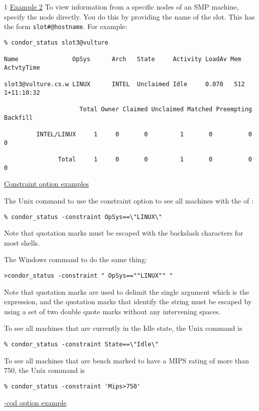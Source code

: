 \begin{ManPage}{\label{man-condor-status}}{1}
\underline{Example 2} To view information from a specific nodes of an
SMP machine, specify the node directly.
You do this by providing the name of the slot.
This has the form \texttt{slot\#@hostname}.
For example:
\footnotesize
\begin{verbatim}
% condor_status slot3@vulture

Name               OpSys      Arch   State     Activity LoadAv Mem   ActvtyTime

slot3@vulture.cs.w LINUX      INTEL  Unclaimed Idle     0.070   512  1+11:10:32

                     Total Owner Claimed Unclaimed Matched Preempting Backfill

         INTEL/LINUX     1     0       0         1       0          0        0

               Total     1     0       0         1       0          0        0
\end{verbatim}
\normalsize

\underline{Constraint option examples}

The Unix command
to use the constraint option to see all machines with the 
of :
\begin{verbatim}
% condor_status -constraint OpSys==\"LINUX\"
\end{verbatim}
Note that quotation marks must be escaped with the backslash characters
for most shells.

The Windows command to do the same thing:
\begin{verbatim}
>condor_status -constraint " OpSys==""LINUX"" "
\end{verbatim}
Note that quotation marks are used to delimit the single argument which
is the expression, and the quotation marks that identify the string
must be escaped by using a set of two double quote marks without
any intervening spaces.

To see all machines that are currently in the Idle state,
the Unix command is
\begin{verbatim}
% condor_status -constraint State==\"Idle\"
\end{verbatim}

To see all machines that are bench marked to have a MIPS rating
of more than 750, the Unix command is
\begin{verbatim}
% condor_status -constraint 'Mips>750' 
\end{verbatim}

\underline{-cod option example}


\end{ManPage}
